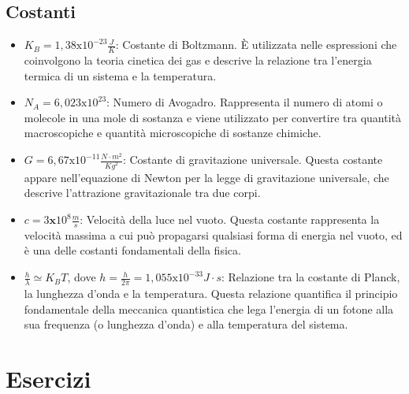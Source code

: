 \documentclass{article}
\begin{document}
\subsection{Costanti}
\begin{itemize}
    \item  \(K_B = 1,38 \text{x} 10 ^ {-23} \frac{J}{K}\): Costante di Boltzmann. È utilizzata nelle espressioni che coinvolgono la teoria cinetica dei gas e descrive la relazione tra l'energia termica di un sistema e la temperatura.
    \item \( N_A = 6,023 \text{x} 10 ^ {23} \): Numero di Avogadro. Rappresenta il numero di atomi o molecole in una mole di sostanza e viene utilizzato per convertire tra quantità macroscopiche e quantità microscopiche di sostanze chimiche.
    \item \( G = 6,67 \text{x} 10 ^ {-11} \frac{N \cdot m^2}{Kg^2}\): Costante di gravitazione universale. Questa costante appare nell'equazione di Newton per la legge di gravitazione universale, che descrive l'attrazione gravitazionale tra due corpi.
    \item \( c = 3 \textbf{x} 10 ^ 8 \frac{m}{s}\): Velocità della luce nel vuoto. Questa costante rappresenta la velocità massima a cui può propagarsi qualsiasi forma di energia nel vuoto, ed è una delle costanti fondamentali della fisica.
    \item \( \frac{h}{\lambda} \simeq K_BT\), dove \(h = \frac{h}{2 \pi} = 1,055 \text{x} 10 ^ {-33} J \cdot s\): Relazione tra la costante di Planck, la lunghezza d'onda e la temperatura. Questa relazione quantifica il principio fondamentale della meccanica quantistica che lega l'energia di un fotone alla sua frequenza (o lunghezza d'onda) e alla temperatura del sistema.
\end{itemize}
\newpage
\section{Esercizi}
\end{document}
